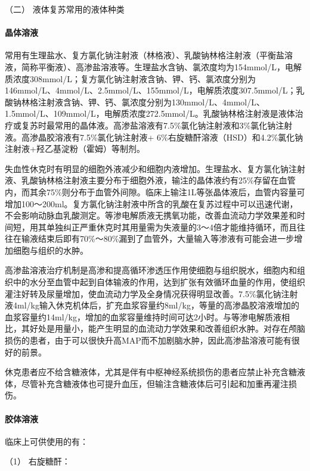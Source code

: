 \hypertarget{text00061.htmlux5cux23CHP2-4-3-2-2}{}
（二） 液体复苏常用的液体种类

\paragraph{晶体溶液}

常用有生理盐水、复方氯化钠注射液（林格液）、乳酸钠林格注射液（平衡盐溶液，简称平衡液）、高渗盐溶液等。生理盐水含钠、氯浓度均为154mmol/L，电解质浓度308mmol/L；复方氯化钠注射液含钠、钾、钙、氯浓度分别为146mmol/L、4mmol/L、2.5mmol/L、155mmol/L，电解质浓度307.5mmol/L；乳酸钠林格注射液含钠、钾、钙、氯浓度分别为130mmol/L、4mmol/L、1.5mmol/L、109mmol/L，电解质浓度272.5mmol/L。乳酸钠林格注射液是液体治疗或复苏时最常用的晶体液。高渗盐溶液有7.5\%氯化钠注射液和3\%氯化钠注射液。高渗晶胶溶液有7.5\%氯化钠注射液+
6\%右旋糖酐溶液（HSD）和4.2\%氯化钠注射液+羟乙基淀粉（霍姆）等制剂。

失血性休克时有明显的细胞外液减少和细胞内液增加。生理盐水、复方氯化钠注射液、乳酸钠林格注射液主要分布于细胞外液，输注的晶体液约有25\%存留在血管内，而其余75\%则分布于血管外间隙。临床上输注1L等张晶体液后，血管内容量可增加100～200ml。复方氯化钠注射液中所含的乳酸在复苏过程中可以迅速代谢，不会影响动脉血乳酸测定。等渗电解质液无携氧功能，改善血流动力学效果差和时间短，用其单独纠正严重休克时其用量需为失液量的3～4倍才能维持循环，而且往往在输液结束后即有70\%～80\%漏到了血管外，大量输入等渗液有可能会进一步增加细胞与组织的水肿。

高渗盐溶液治疗机制是高渗和提高循环渗透压作用使细胞与组织脱水，细胞内和组织中的水分至血管中起到自体输液的作用，达到扩张有效循环血量的作用，使组织灌注好转及尿量增加，使血流动力学及全身情况获得明显改善。7.5\%氯化钠注射液4ml/kg输入休克机体后，扩充血浆容量约8ml/kg，等量的高渗晶胶溶液增加的血浆容量约14ml/kg，增加的血浆容量维持时间可达2小时。与等渗电解质液相比，其好处是用量小，能产生明显的血流动力学效果和改善组织水肿。对存在颅脑损伤的患者，由于可以很快升高MAP而不加剧脑水肿，因此高渗盐溶液可能有很好的前景。

休克患者应不给含糖液体，尤其是伴有中枢神经系统损伤的患者应禁止补充含糖液体，尽管补充含糖液体也可提升血压，但输注含糖液体后可引起和加重再灌注损伤。

\paragraph{胶体溶液}

临床上可供使用的有：

\hypertarget{text00061.htmlux5cux23CHP2-4-3-2-2-2-1}{}
（1） 右旋糖酐：

